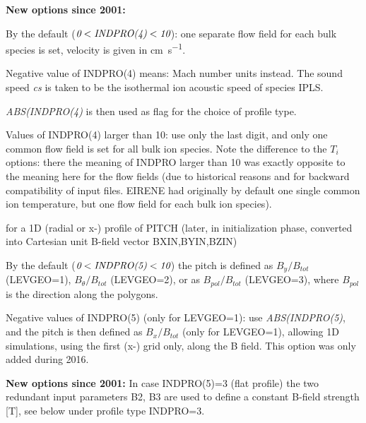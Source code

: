 \begin{description}
\begin{description}
                \textbf{New options since 2001:} 

                By the default ($\emph{0} < \emph{INDPRO(4)} < \emph{10}$): one separate flow
                field for each bulk species is set, velocity is given in
                \si{\centi\metre\per\second}.

                Negative value of INDPRO(4) means: Mach number units instead.
                The sound speed \emph{cs} is taken to be the isothermal ion acoustic speed of
                species IPLS.

                \emph{ABS(INDPRO(4)} is then used as flag for the choice of profile type.

                Values of INDPRO(4) larger than 10: use only the last digit, and only one
                common flow field is set for all bulk ion species.
                Note the difference to the $T_i$ options:
                there the meaning of INDPRO larger than 10 was exactly opposite
                to the meaning here
                for the flow fields (due to historical reasons and for backward
                compatibility of input
                files.
                EIRENE had originally by default one single common ion temperature, but one
                flow field for each bulk ion species).

          \item[INDPRO(5)] for a 1D (radial or x-) profile of PITCH (later, in
                initialization phase,  converted into Cartesian unit B-field vector
                BXIN,BYIN,BZIN) 

                By the default ($\emph{0} < \emph{INDPRO(5)} < \emph{10}$) the pitch is defined
                as $B_y/B_{tot}$ (LEVGEO=1), $B_{\theta}/B_{tot}$ (LEVGEO=2), or as
                $B_{pol}/B_{tot}$ (LEVGEO=3), where $B_{pol}$ is the direction along the
                polygons.

                Negative values of INDPRO(5) (only for LEVGEO=1): use \emph{ABS(INDPRO(5)}, and
                the pitch is then defined as	$B_x/B_{tot}$ (only for LEVGEO=1), allowing 1D
                simulations, using the first (x-) grid only, along the B field.
                This option was only added during 2016.

                \textbf{New options since 2001:} In case INDPRO(5)=3 (flat profile) the two
                redundant input parameters B2, B3 are used to define a constant B-field
                strength [T], see below under profile type INDPRO=3.


\end{description}
\end{description}
